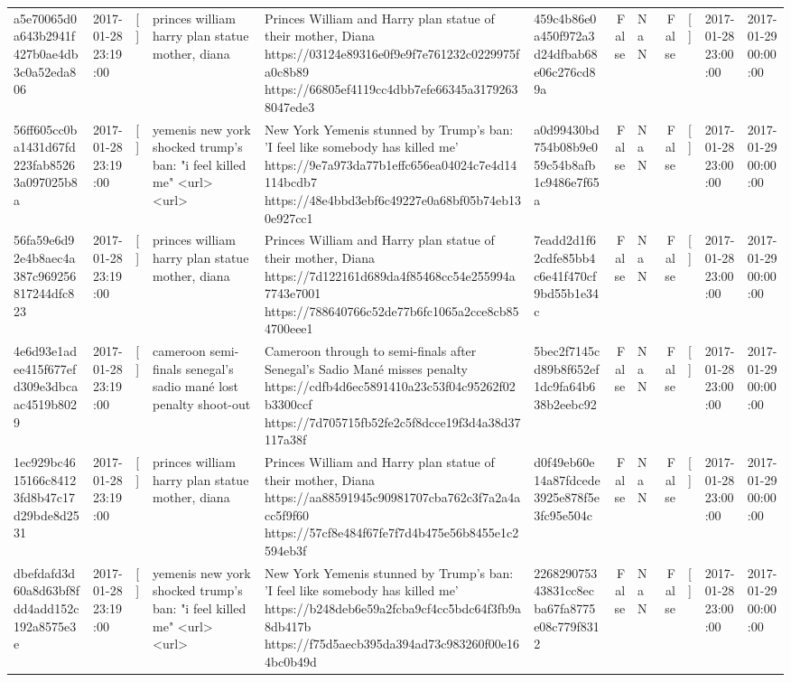 \begin{tabular}{llllllrlrlll}
a5e70065d0a643b2941f427b0ae4db3c0a52eda806 & 2017-01-28 23:19:00 & [] & princes william harry plan statue mother, diana & Princes William and Harry plan statue of their mother, Diana https://03124e89316e0f9e9f7e761232c0229975fa0c8b89 https://66805ef4119cc4dbb7efe66345a31792638047ede3 & 459c4b86e0a450f972a3d24dfbab68e06c276cd89a & False & NaN & False & [] & 2017-01-28 23:00:00 & 2017-01-29 00:00:00 \\
56ff605cc0ba1431d67fd223fab85263a097025b8a & 2017-01-28 23:19:00 & [] & yemenis new york shocked trump's ban: "i feel killed me" <url> <url> & New York Yemenis stunned by Trump's ban: 'I feel like somebody has killed me' https://9e7a973da77b1effc656ea04024c7e4d14114bcdb7 https://48e4bbd3ebf6c49227e0a68bf05b74eb130e927cc1 & a0d99430bd754b08b9e059c54b8afb1c9486e7f65a & False & NaN & False & [] & 2017-01-28 23:00:00 & 2017-01-29 00:00:00 \\
56fa59e6d92e4b8aec4a387c969256817244dfc823 & 2017-01-28 23:19:00 & [] & princes william harry plan statue mother, diana & Princes William and Harry plan statue of their mother, Diana https://7d122161d689da4f85468cc54e255994a7743e7001 https://788640766c52de77b6fc1065a2cce8cb854700eee1 & 7eadd2d1f62cdfe85bb4c6e41f470cf9bd55b1e34c & False & NaN & False & [] & 2017-01-28 23:00:00 & 2017-01-29 00:00:00 \\
4e6d93e1adee415f677efd309e3dbcaac4519b8029 & 2017-01-28 23:19:00 & [] & cameroon semi-finals senegal's sadio mané lost penalty shoot-out & Cameroon through to semi-finals after Senegal’s Sadio Mané misses penalty https://cdfb4d6ec5891410a23c53f04c95262f02b3300ccf https://7d705715fb52fe2c5f8dcce19f3d4a38d37117a38f & 5bec2f7145cd89b8f652ef1dc9fa64b638b2eebc92 & False & NaN & False & [] & 2017-01-28 23:00:00 & 2017-01-29 00:00:00 \\
1ec929bc4615166c84123fd8b47c17d29bde8d2531 & 2017-01-28 23:19:00 & [] & princes william harry plan statue mother, diana & Princes William and Harry plan statue of their mother, Diana https://aa88591945c90981707cba762c3f7a2a4acc5f9f60 https://57cf8e484f67fe7f7d4b475e56b8455e1c2594eb3f & d0f49eb60e14a87fdcede3925e878f5e3fc95e504c & False & NaN & False & [] & 2017-01-28 23:00:00 & 2017-01-29 00:00:00 \\
dbefdafd3d60a8d63bf8fdd4add152c192a8575e3e & 2017-01-28 23:19:00 & [] & yemenis new york shocked trump's ban: "i feel killed me" <url> <url> & New York Yemenis stunned by Trump's ban: 'I feel like somebody has killed me' https://b248deb6e59a2fcba9cf4cc5bdc64f3fb9a8db417b https://f75d5aecb395da394ad73c983260f00e164bc0b49d & 226829075343831cc8ecba67fa8775e08c779f8312 & False & NaN & False & [] & 2017-01-28 23:00:00 & 2017-01-29 00:00:00 \\

\end{tabular}
